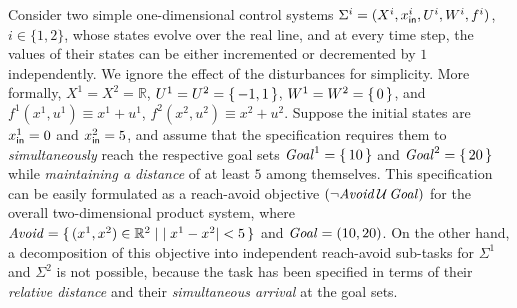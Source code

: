 \begin{example}
	Consider two simple one-dimensional control systems $\Sigma^i=(X^i,x_{\mathsf{in}}^i,U^i,W^i,f^i)$, $i\in\{1,2\}$,
	 whose states evolve over the real line, and at every time step, the values of their states can be either incremented or decremented by $1$ independently.
	We ignore the effect of the disturbances for simplicity.
	More formally, $X^1=X^2=\mathbb{R}$, $U^1=U^2=\set{-1,1}$, $W^1=W^2=\set{0}$, and $f^1(x^1,u^1)\equiv x^1+u^1$, $f^2(x^2,u^2)\equiv x^2+u^2$.
	Suppose the initial states are $x_{\mathsf{in}}^1=0$ and $x_{\mathsf{in}}^2=5$, and assume that the specification requires them to \emph{simultaneously} reach the respective goal sets $\mathit{Goal}^1=\set{10}$ and $\mathit{Goal}^2=\set{20}$ while \emph{maintaining a distance} of at least $5$ among themselves.
	This specification can be easily formulated as a reach-avoid objective $\left(\lnot\mathit{Avoid}\,\mathcal{U}\, \mathit{Goal}\right)$ for the overall two-dimensional product system, where $\mathit{Avoid} = \set{ (x^1,x^2)\in \mathbb{R}^2  \mid |x^1-x^2| < 5}$ and $\mathit{Goal} = (10,20)$.
	On the other hand, a decomposition of this objective into independent reach-avoid sub-tasks for $\Sigma^1$ and $\Sigma^2$ is not possible, because the task has been specified in terms of their \emph{relative distance} and their \emph{simultaneous arrival} at the goal sets.
\end{example}





